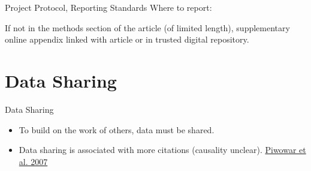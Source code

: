 \documentclass{beamer}
\begin{document}
 { %
    \begin{frame}[plain, label=AEAreg]
     \end{frame}
}

\begin{frame}{Project Protocol, Reporting Standards}
Where to report:

If not in the methods section of the article (of limited length), supplementary online appendix linked with article or in trusted digital repository.
\end{frame}
\section{Data Sharing}
\begin{frame}{Data Sharing}
\begin{itemize}
\item
To build on the work of others, data must be shared.
\item
Data sharing is associated with more citations (causality unclear). \href{http://journals.plos.org/plosone/article?id=10.1371/journal.pone.0000308}{Piwowar et al. 2007} 
\end{itemize}
\end{frame}
\end{document}
